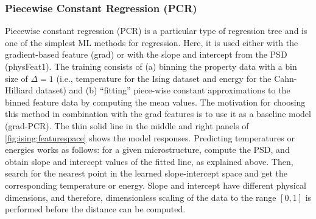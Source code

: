 \documentclass[11pt, authoryear]{elsarticle}
\begin{document}
	
	
	\subsubsection{Piecewise Constant Regression (PCR)}
	\label{sec:pcrmodel}
	Piecewise constant regression (PCR) is a particular type of regression tree and is 
	one of the simplest \gls{ML} methods for regression. Here, it is used either 
	with the gradient-based feature (grad) or with the slope and intercept from the 
	\gls{PSD} (physFeat1). The training consists of (a) binning 
	the property data with a bin size of $\Delta=1$ (i.e., temperature for the 
	Ising dataset and energy for the Cahn-Hilliard dataset) and  (b) 
	\enquote{fitting} piece-wise constant approximations to the binned feature
	data by computing the mean values. The motivation for choosing this method
	in combination with the grad features is to use it as a baseline model 
	(grad-PCR). The thin solid line in the middle and right panels of
	\cref{fig:ising:featurespace} shows the model responses. 
	Predicting temperatures or energies works as follows: for a given 
	microstructure, compute the \gls{PSD}, and obtain slope and intercept values 
	of the fitted line, as explained above. Then, search for the nearest point in 
	the learned slope-intercept space and get the corresponding temperature or 
	energy. Slope and intercept have different physical dimensions, and  therefore,  
	dimensionless scaling of the data to the range $[0, 1]$ is performed before the
	distance can be computed.
	
	
	
	
\end{document}
